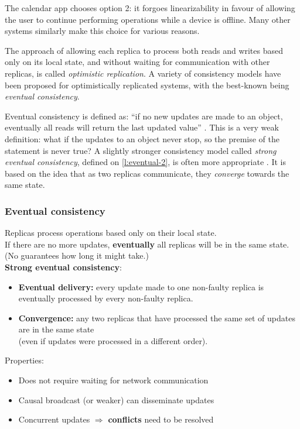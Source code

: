 The calendar app chooses option 2: it forgoes linearizability in favour of allowing the user to continue performing operations while a device is offline.
Many other systems similarly make this choice for various reasons.

The approach of allowing each replica to process both reads and writes based only on its local state, and without waiting for communication with other replicas, is called \emph{optimistic replication}.
A variety of consistency models have been proposed for optimistically replicated systems, with the best-known being \emph{eventual consistency}.

Eventual consistency is defined as: ``if no new updates are made to an object, eventually all reads will return the last updated value'' \citep{Vogels:2009}.
This is a very weak definition: what if the updates to an object never stop, so the premise of the statement is never true?
A slightly stronger consistency model called \emph{strong eventual consistency}, defined on \autoref{l:eventual-2}, is often more appropriate \citep{Shapiro:2011}.
It is based on the idea that as two replicas communicate, they \emph{converge} towards the same state.

\begin{frame}
    \label{s:eventual-2}
    \frametitle{Eventual consistency}
    Replicas process operations based only on their local state.\\[0.5em]
    If there are no more updates, \textbf{eventually} all replicas will be in the same state.
    (No guarantees how long it might take.)\\[0.5em]\pause
    \textbf{Strong eventual consistency}:
    \begin{itemize}
        \item \textbf{Eventual delivery:} every update made to one non-faulty replica is eventually processed by every non-faulty replica.\pause
        \item \textbf{Convergence:} any two replicas that have processed the same set of updates are in the same state\\
            (even if updates were processed in a different order).\\[0.5em]\pause
    \end{itemize}
    Properties:
    \begin{itemize}
        \item Does not require waiting for network communication
        \item Causal broadcast (or weaker) can disseminate updates\pause
        \item Concurrent updates $\Longrightarrow$ \textbf{conflicts} need to be resolved
    \end{itemize}
\end{frame}
\label{l:eventual-2}

